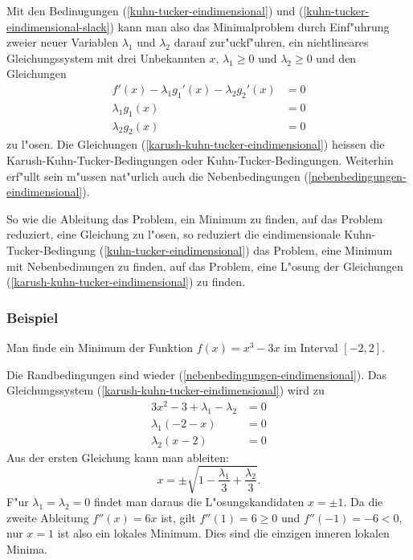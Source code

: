 Mit den Bedinugungen (\ref{kuhn-tucker-eindimensional}) und
(\ref{kuhn-tucker-eindimensional-slack})
kann man also das Minimalproblem
durch Einf"uhrung zweier neuer Variablen $\lambda_1$ und $\lambda_2$
darauf zur"uckf"uhren, ein nichtlineares Gleichungssystem mit
drei Unbekannten $x$, $\lambda_1\ge 0$ und $\lambda_2\ge0$ und den
Gleichungen
\begin{equation}
\begin{aligned}
f'(x)-\lambda_1g_1'(x)-\lambda_2g_2'(x)&=0\\
\lambda_1g_1(x)&= 0\\
\lambda_2g_2(x)&= 0
\end{aligned}
\label{karush-kuhn-tucker-eindimensional}
\end{equation}
zu l"osen.
Die Gleichungen (\ref{karush-kuhn-tucker-eindimensional}) heissen
die Karush-Kuhn-Tucker-Bedingungen oder Kuhn-Tucker-Bedingungen.
Weiterhin erf"ullt sein m"ussen nat"urlich auch die
Nebenbedingungen (\ref{nebenbedingungen-eindimensional}).

So wie die Ableitung das Problem, ein Minimum zu finden, auf das
Problem reduziert, eine Gleichung zu l"osen, so reduziert die
eindimensionale Kuhn-Tucker-Bedingung (\ref{kuhn-tucker-eindimensional})
das Problem, eine Minimum
mit Nebenbedinungen zu finden, auf das Problem, eine L"osung der
Gleichungen (\ref{karush-kuhn-tucker-eindimensional}) zu finden.

\subsubsection{Beispiel}
Man finde ein Minimum der Funktion $f(x)=x^3-3x$ im Interval $[-2,2]$.

\medskip
{\parindent 0pt
Die Randbedingungen sind wieder (\ref{nebenbedingungen-eindimensional}).}
Das Gleichungssystem (\ref{karush-kuhn-tucker-eindimensional}) wird
zu
\begin{align*}
3x^2-3+\lambda_1-\lambda_2&=0\\
\lambda_1(-2-x)&= 0\\
\lambda_2(x-2)&= 0
\end{align*}
Aus der ersten Gleichung kann man ableiten:
\[
x=\pm
\sqrt{1-\frac{\lambda_1}3+\frac{\lambda_2}3}.
\]
F"ur $\lambda_1=\lambda_2=0$ findet man daraus die L"osungskandidaten
$x=\pm 1$. Da die zweite Ableitung $f''(x)=6x$ ist, gilt $f''(1)=6\ge 0$
und $f''(-1)=-6<0$, nur $x=1$ ist also ein lokales Minimum. Dies sind die
einzigen inneren lokalen Minima.

